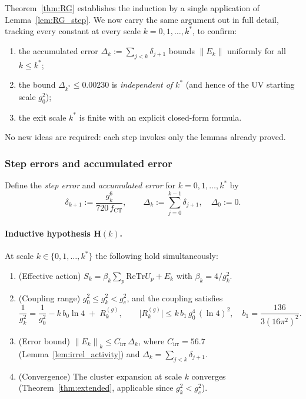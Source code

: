 \documentclass[11pt,a4paper]{amsart}
\theoremstyle{definition}
\newcommand{\re}{\mathrm{Re}}
\newcommand{\Tr}{\mathrm{Tr}}
\newcommand{\norm}[1]{\left\|#1\right\|}
\newcommand{\gB}{g^2_c}
\newcommand{\CT}{\mathrm{CT}}
\begin{document}
Theorem~\ref{thm:RG} establishes the induction by a single application of
Lemma~\ref{lem:RG_step}.  We now carry the same argument out in full detail,
tracking every constant at every scale $k = 0,1,\ldots,k^*$, to confirm:
\begin{enumerate}[label=(\alph*)]
\item the accumulated error $\Delta_k := \sum_{j<k}\delta_{j+1}$ bounds $\norm{E_k}$
      uniformly for all $k \le k^*$;
\item the bound $\Delta_{k^*} \le 0.00230$ is \emph{independent of $k^*$}
      (and hence of the UV starting scale $g^2_0$);
\item the exit scale $k^*$ is finite with an explicit closed-form formula.
\end{enumerate}
No new ideas are required: each step invokes only the lemmas already proved.

\subsubsection*{Step errors and accumulated error}

Define the \emph{step error} and \emph{accumulated error} for
$k = 0,1,\ldots,k^*$ by
\begin{equation}
\label{eq:step_accum}
  \delta_{k+1} := \frac{g^6_k}{720\,f_{\CT}},
  \qquad
  \Delta_k     := \sum_{j=0}^{k-1}\delta_{j+1},
  \quad \Delta_0 := 0.
\end{equation}

\paragraph{Inductive hypothesis $\mathbf{H}(k)$.}
At scale $k \in \{0,1,\ldots,k^*\}$ the following hold simultaneously:
\begin{enumerate}[label=\textup{(H\arabic*)},ref={H\arabic*}]
\item\label{IH1}
  (Effective action)\quad
  $S_k = \beta_k\sum_p\re\Tr U_p + E_k$ with $\beta_k = 4/g^2_k$.
\item\label{IH2}
  (Coupling range)\quad
  $g^2_0 \le g^2_k < \gB$, and the coupling satisfies
  \begin{equation}
  \label{eq:gk_formula}
    \frac{1}{g^2_k}
    = \frac{1}{g^2_0} - k\,b_0\ln 4
    \;+\; R^{(g)}_k,
    \qquad
    \bigl|R^{(g)}_k\bigr| \le k\,b_1\,g^4_0\,(\ln 4)^2,
    \quad
    b_1 = \frac{136}{3(16\pi^2)^2}.
  \end{equation}
\item\label{IH3}
  (Error bound)\quad
  $\norm{E_k}_k \le C_{\mathrm{irr}}\,\Delta_k$,
  where $C_{\mathrm{irr}} = 56.7$ (Lemma~\ref{lem:irrel_activity})
  and $\Delta_k = \sum_{j<k}\delta_{j+1}$.
\item\label{IH4}
  (Convergence)\quad
  The cluster expansion at scale $k$ converges
  (Theorem~\ref{thm:extended}, applicable since $g^2_k < \gB$).
\end{enumerate}
\end{document}
